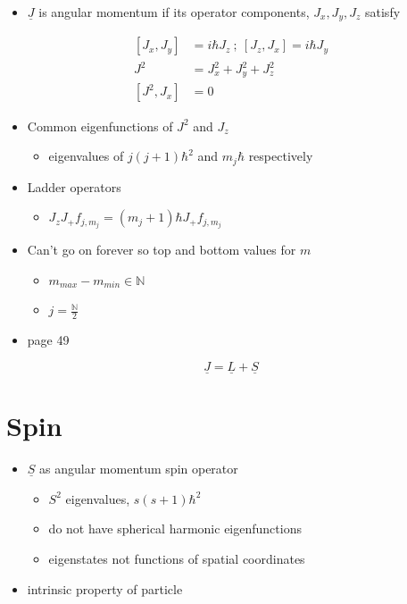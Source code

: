 \documentclass[a4paper,11pt,normalem]{article}
\begin{document}
\begin{itemize}
\item
  \(\underline{J}\) is angular momentum if its operator components,
  \(J_x, J_y, J_z\) satisfy
\end{itemize}
\[
    \begin{aligned}
    [J_x, J_y] &= i\hbar J_z ~;~ [J_z, J_x] = i\hbar J_y \\
    J^2 &= J_{x}^2 + J_{y}^2 + J_{z}^2 \\
    [J^2, J_x] &= 0
    \end{aligned}
\]
\begin{itemize}
\item
  Common eigenfunctions of \(J^2\) and \(J_z\)
  \begin{itemize}
  \item
    eigenvalues of \(j(j + 1)\hbar^2\) and \(m_j \hbar\) respectively
  \end{itemize}
\item
  Ladder operators
  \begin{itemize}
  \item
    \(J_zJ_{+}f_{j,m_j} = (m_j + 1)\hbar J_+ f_{j,m_j}\)
  \end{itemize}
\item
  Can't go on forever so top and bottom values for \(m\)
  \begin{itemize}
  \item
    \(m_{max} - m_{min} \in \mathbb{N}\)
  \item
    \(j = \frac{\mathbb{N}}{2}\)
  \end{itemize}
\item
  page 49
\end{itemize}
\[
    \underline{J} = \underline{L} + \underline{S}
\]

\section{Spin}\label{spin}

\begin{itemize}
\item
  \(\underline{S}\) as angular momentum spin operator
  \begin{itemize}
  \item
    \(S^2\) eigenvalues, \(s(s + 1)\hbar^2\)
  \item
    do not have spherical harmonic eigenfunctions
  \item
    eigenstates not functions of spatial coordinates
  \end{itemize}
\item
  intrinsic property of particle
\end{itemize}
\end{document}

